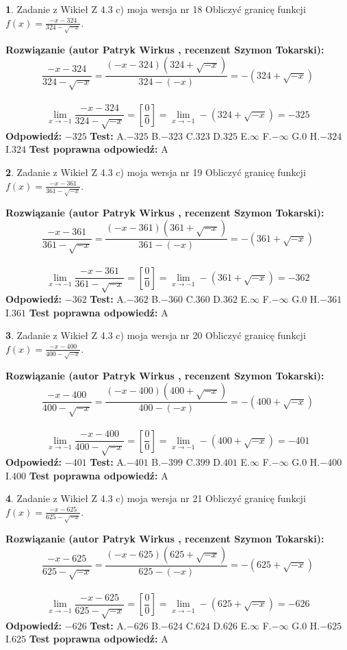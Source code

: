 \documentclass[12pt, a4paper]{article}
\theoremstyle{definition} %
\newtheorem{zad}{}
\newcommand{\zadStart}[1]{\begin{zad}#1\newline}
\newcommand{\zadStop}{\end{zad}}
\newcommand{\rozwStart}[2]{\noindent \textbf{Rozwiązanie (autor #1 , recenzent #2): }\newline}
\newcommand{\rozwStop}{\newline}
\newcommand{\odpStart}{\noindent \textbf{Odpowiedź:}\newline}
\newcommand{\odpStop}{\newline}
\newcommand{\testStart}{\noindent \textbf{Test:}\newline}
\newcommand{\testStop}{\newline}
\newcommand{\kluczStart}{\noindent \textbf{Test poprawna odpowiedź:}\newline}
\newcommand{\kluczStop}{\newline}
\begin{document}
\zadStart{Zadanie z Wikieł Z 4.3 c) moja wersja nr 18}
Obliczyć granicę funkcji $f(x)=\frac{-x-324}{324-\sqrt{-x}}$.
\zadStop
\rozwStart{Patryk Wirkus}{Szymon Tokarski}
$$\frac{-x-324}{324-\sqrt{-x}}=\frac{(-x-324)(324+\sqrt{-x})}{324-(-x)}=-(324+\sqrt{-x})$$
\\
$$\lim\limits_{x\to-1}\frac{-x-324}{324-\sqrt{-x}}=[\frac{0}{0}]=\lim\limits_{x\to-1}-(324+\sqrt{-x}) =-325$$
\rozwStop
\odpStart
$-325$
\odpStop
\testStart
A.$-325$
B.$-323$
C.$323$
D.$325$
E.$\infty$
F.$-\infty$
G.$0$
H.$-324$
I.$324$
\testStop
\kluczStart
A
\kluczStop



\zadStart{Zadanie z Wikieł Z 4.3 c) moja wersja nr 19}
Obliczyć granicę funkcji $f(x)=\frac{-x-361}{361-\sqrt{-x}}$.
\zadStop
\rozwStart{Patryk Wirkus}{Szymon Tokarski}
$$\frac{-x-361}{361-\sqrt{-x}}=\frac{(-x-361)(361+\sqrt{-x})}{361-(-x)}=-(361+\sqrt{-x})$$
\\
$$\lim\limits_{x\to-1}\frac{-x-361}{361-\sqrt{-x}}=[\frac{0}{0}]=\lim\limits_{x\to-1}-(361+\sqrt{-x}) =-362$$
\rozwStop
\odpStart
$-362$
\odpStop
\testStart
A.$-362$
B.$-360$
C.$360$
D.$362$
E.$\infty$
F.$-\infty$
G.$0$
H.$-361$
I.$361$
\testStop
\kluczStart
A
\kluczStop



\zadStart{Zadanie z Wikieł Z 4.3 c) moja wersja nr 20}
Obliczyć granicę funkcji $f(x)=\frac{-x-400}{400-\sqrt{-x}}$.
\zadStop
\rozwStart{Patryk Wirkus}{Szymon Tokarski}
$$\frac{-x-400}{400-\sqrt{-x}}=\frac{(-x-400)(400+\sqrt{-x})}{400-(-x)}=-(400+\sqrt{-x})$$
\\
$$\lim\limits_{x\to-1}\frac{-x-400}{400-\sqrt{-x}}=[\frac{0}{0}]=\lim\limits_{x\to-1}-(400+\sqrt{-x}) =-401$$
\rozwStop
\odpStart
$-401$
\odpStop
\testStart
A.$-401$
B.$-399$
C.$399$
D.$401$
E.$\infty$
F.$-\infty$
G.$0$
H.$-400$
I.$400$
\testStop
\kluczStart
A
\kluczStop



\zadStart{Zadanie z Wikieł Z 4.3 c) moja wersja nr 21}
Obliczyć granicę funkcji $f(x)=\frac{-x-625}{625-\sqrt{-x}}$.
\zadStop
\rozwStart{Patryk Wirkus}{Szymon Tokarski}
$$\frac{-x-625}{625-\sqrt{-x}}=\frac{(-x-625)(625+\sqrt{-x})}{625-(-x)}=-(625+\sqrt{-x})$$
\\
$$\lim\limits_{x\to-1}\frac{-x-625}{625-\sqrt{-x}}=[\frac{0}{0}]=\lim\limits_{x\to-1}-(625+\sqrt{-x}) =-626$$
\rozwStop
\odpStart
$-626$
\odpStop
\testStart
A.$-626$
B.$-624$
C.$624$
D.$626$
E.$\infty$
F.$-\infty$
G.$0$
H.$-625$
I.$625$
\testStop
\kluczStart
A
\kluczStop
\end{document}
